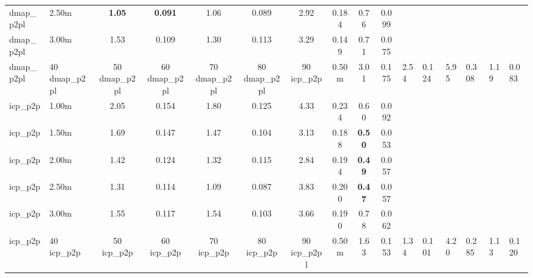 \begin{tabular}{llcccccccc}
dmap\_p2pl & 2.50m & \bfseries 1.05 & \bfseries 0.091 & 1.06 & 0.089 & 2.92 & 0.184 & 0.76 & 0.099 \\
dmap\_p2pl & 3.00m & 1.53 & 0.109 & 1.30 & 0.113 & 3.29 & 0.149 & 0.71 & 0.075 \\
dmap\_p2pl & 40%
dmap\_p2pl & 50%
dmap\_p2pl & 60%
dmap\_p2pl & 70%
dmap\_p2pl & 80%
dmap\_p2pl & 90%
\midrule
icp\_p2p & 0.50m & 3.01 & 0.175 & 2.54 & 0.124 & 5.95 & 0.308 & 1.19 & 0.083 \\
icp\_p2p & 1.00m & 2.05 & 0.154 & 1.80 & 0.125 & 4.33 & 0.234 & 0.60 & 0.092 \\
icp\_p2p & 1.50m & 1.69 & 0.147 & 1.47 & 0.104 & 3.13 & 0.188 & \bfseries 0.50 & 0.053 \\
icp\_p2p & 2.00m & 1.42 & 0.124 & 1.32 & 0.115 & 2.84 & 0.194 & \bfseries 0.49 & 0.057 \\
icp\_p2p & 2.50m & 1.31 & 0.114 & 1.09 & 0.087 & 3.83 & 0.200 & \bfseries 0.47 & 0.057 \\
icp\_p2p & 3.00m & 1.55 & 0.117 & 1.54 & 0.103 & 3.66 & 0.190 & 0.78 & 0.062 \\
icp\_p2p & 40%
icp\_p2p & 50%
icp\_p2p & 60%
icp\_p2p & 70%
icp\_p2p & 80%
icp\_p2p & 90%
\midrule
icp\_p2pl & 0.50m & 1.63 & 0.153 & 1.34 & 0.101 & 4.20 & 0.285 & 1.13 & 0.120 \\

\end{tabular}
